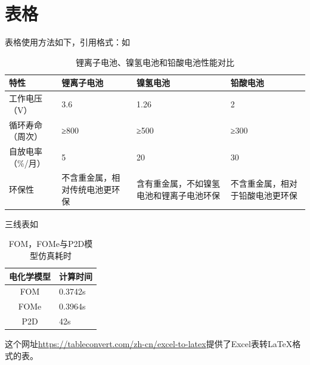 \section{表格}
表格使用方法如下，引用格式：如
\begin{table}[H]%
	\centering
	\begin{spacing}{1.35}
		\caption{锂离子电池、镍氢电池和铅酸电池性能对比}
		\label{tab1-1}
		\begin{tabular}{|m{2.5cm}<{\centering}|m{3.2cm}<{\centering}|m{3.2cm}<{\centering}|m{3.2cm}<{\centering}|}
			\hline
			特性  & 锂离子电池 & 镍氢电池 & 铅酸电池  \\%
			\hline
        工作电压（V） & 3.6 & 1.26 & 2 \\ \hline
        循环寿命（周次） & ≥800 & ≥500 & ≥300 \\ \hline
        自放电率（\%/月） & 5 & 20 & 30 \\ \hline
        环保性 & 不含重金属，相对传统电池更环保 & 含有重金属，不如镍氢电池和锂离子电池环保 & 不含重金属，相对于铅酸电池更环保 \\ \hline
		\end{tabular}
	\end{spacing}
\end{table}

三线表如
\begin{table}[h!]
\centering
\begin{spacing}{1.35}
\caption{FOM，FOMe与P2D模型仿真耗时}
\label{tab2-8}
\begin{tabular}{cm{2.5cm}<{\centering}}
\toprule[1pt]
	电化学模型 	&	计算时间        \\
\midrule[0.5pt]
FOM &         0.3742s    \\
FOMe	&       0.3964s    \\
P2D   &   42s  \\
\bottomrule[1pt]
\end{tabular}
\end{spacing}
\end{table}

这个网址\url{https://tableconvert.com/zh-cn/excel-to-latex}提供了Excel表转{\LaTeX}格式的表。
